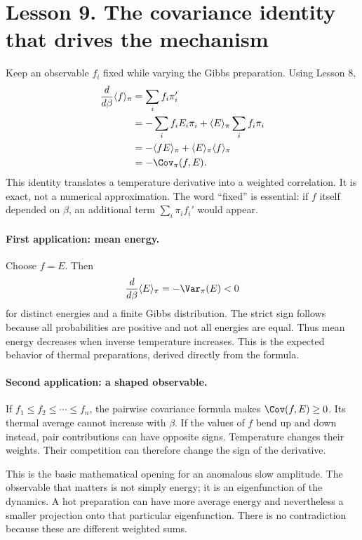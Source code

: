 \clearpage
\section*{Lesson 9. The covariance identity that drives the mechanism}
Keep an observable $f_i$ fixed while varying the Gibbs preparation. Using
Lesson 8,
\begin{align*}
\frac{d}{d\beta}\langle f\rangle_\pi
&=\sum_i f_i\pi_i'\\
&=-\sum_i f_i E_i\pi_i+\langle E\rangle_\pi\sum_i f_i\pi_i\\
&=-\langle fE\rangle_\pi+\langle E\rangle_\pi\langle f\rangle_\pi\\
&=-\Cov_\pi(f,E).
\end{align*}
This identity translates a temperature derivative into a weighted correlation.
It is exact, not a numerical approximation. The word ``fixed'' is essential:
if $f$ itself depended on $\beta$, an additional term
$\sum_i\pi_i f_i'$ would appear.

\paragraph{First application: mean energy.}
Choose $f=E$. Then
\[
\frac{d}{d\beta}\langle E\rangle_\pi=-\Var_\pi(E)<0
\]
for distinct energies and a finite Gibbs distribution. The strict sign follows
because all probabilities are positive and not all energies are equal.
Thus mean energy decreases when inverse temperature increases. This is the
expected behavior of thermal preparations, derived directly from the formula.

\paragraph{Second application: a shaped observable.}
If $f_1\leq f_2\leq\cdots\leq f_n$, the pairwise covariance formula makes
$\Cov(f,E)\geq0$. Its thermal average cannot increase with $\beta$.
If the values of $f$ bend up and down instead, pair contributions can have
opposite signs. Temperature changes their weights. Their competition can
therefore change the sign of the derivative.

This is the basic mathematical opening for an anomalous slow amplitude. The
observable that matters is not simply energy; it is an eigenfunction of the
dynamics. A hot preparation can have more average energy and nevertheless a
smaller projection onto that particular eigenfunction. There is no
contradiction because these are different weighted sums.

